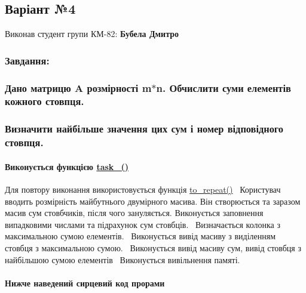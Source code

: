 \begin{center} \subsection*{Варіант №4}\end{center} 

\begin{center} \end{center}  Виконав студент групи КМ-\/82\+: {\bfseries Бубела Дмитро}~\newline
 \subsubsection*{Завдання\+:}

\subsubsection*{Дано матрицю A розмірності m$\ast$n. Обчислити суми елементів кожного стовпця.}

\subsubsection*{Визначити найбільше значення цих сум і номер відповідного стовпця.}

\paragraph*{Виконується функцією \hyperlink{main_8c_a2e10594dc040249a898e2880b4c64322}{task\+\_()}}

Для повтору виконання використовується функція \hyperlink{lab__functions_8h_a770281b98587f9f65ca4cc75b1d061db}{to\+\_\+repeat()}~\newline
Користувач вводить розмірність майбутнього двумірного масива. Він створюється та заразом масив сум стовбчиків, після чого зануляється. Виконується заповнення випадковими числами та підрахунок сум стовбців.~\newline
Визначається колонка з максимальною сумою елементів.~\newline
Виконується вивід масиву з виділенням стовбця з максимальною сумою.~\newline
Виконується вивід масиву сум, вивід стовбця з найбільшою сумою елементів~\newline
Виконується вивільнення пам\textquotesingle{}яті.~\newline
\paragraph*{Нижче наведений сирцевий код прорами}


